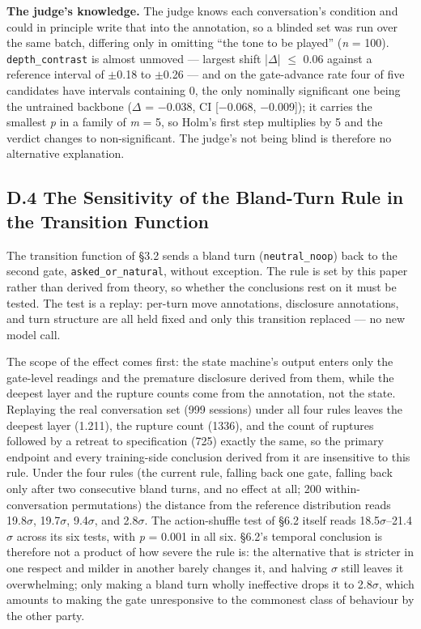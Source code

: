 \documentclass[letterpaper]{article}
\begin{document}
\textbf{The judge's knowledge.} The judge knows each conversation's condition and could in principle write that into the annotation, so a blinded set was run over the same batch, differing only in omitting ``the tone to be played'' (\textit{n} = 100). \texttt{depth\_contrast} is almost unmoved --- largest shift |$\Delta$| $\leq$ 0.06 against a reference interval of $\pm$0.18 to $\pm$0.26 --- and on the gate-advance rate four of five candidates have intervals containing 0, the only nominally significant one being the untrained backbone ($\Delta$ = $-$0.038, CI [$-$0.068, $-$0.009]); it carries the smallest \textit{p} in a family of \textit{m} = 5, so Holm's first step multiplies by 5 and the verdict changes to non-significant. The judge's not being blind is therefore no alternative explanation.


\subsection*{D.4 The Sensitivity of the Bland-Turn Rule in the Transition Function}

The transition function of \S{}3.2 sends a bland turn (\texttt{neutral\_noop}) back to the second gate, \texttt{asked\_or\_natural}, without exception. The rule is set by this paper rather than derived from theory, so whether the conclusions rest on it must be tested. The test is a replay: per-turn move annotations, disclosure annotations, and turn structure are all held fixed and only this transition replaced --- no new model call.

The scope of the effect comes first: the state machine's output enters only the gate-level readings and the premature disclosure derived from them, while the deepest layer and the rupture counts come from the annotation, not the state. Replaying the real conversation set (999 sessions) under all four rules leaves the deepest layer (1.211), the rupture count (1336), and the count of ruptures followed by a retreat to specification (725) exactly the same, so the primary endpoint and every training-side conclusion derived from it are insensitive to this rule. Under the four rules (the current rule, falling back one gate, falling back only after two consecutive bland turns, and no effect at all; 200 within-conversation permutations) the distance from the reference distribution reads 19.8$\sigma$, 19.7$\sigma$, 9.4$\sigma$, and 2.8$\sigma$. The action-shuffle test of \S{}6.2 itself reads 18.5$\sigma$--21.4$\sigma$ across its six tests, with \textit{p} = 0.001 in all six. \S{}6.2's temporal conclusion is therefore not a product of how severe the rule is: the alternative that is stricter in one respect and milder in another barely changes it, and halving $\sigma$ still leaves it overwhelming; only making a bland turn wholly ineffective drops it to 2.8$\sigma$, which amounts to making the gate unresponsive to the commonest class of behaviour by the other party.
\end{document}
